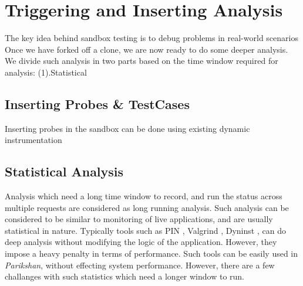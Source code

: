 \section{Triggering and Inserting Analysis}
\label{sec:trigger}

The key idea behind sandbox testing is to debug problems in real-world scenarios
Once we have forked off a clone, we are now ready to do some deeper analysis. 
We divide such analysis in two parts based on the time window required for analysis: (1).Statistical

\subsection{Inserting Probes \& TestCases}
\label{sec:unitTests}

Inserting probes in the sandbox can be done using existing dynamic instrumentation

\subsection{Statistical Analysis}
\label{sec:statisticalTests}

Analysis which need a long time window to record, and run the status across multiple requests are considered as long running analysis. 
Such analysis can be considered to be similar to monitoring of live applications, and are usually statistical in nature.
Typically tools such as PIN \cite{pin}, Valgrind \cite{valgrind}, Dyninst \cite{dyninst}, can do deep analysis without modifying the logic of the application.
However, they impose a heavy penalty in terms of performance.
Such tools can be easily used in \textit{Parikshan}, without effecting system performance.
However, there are a few challanges with such statistics which need a longer window to run.

